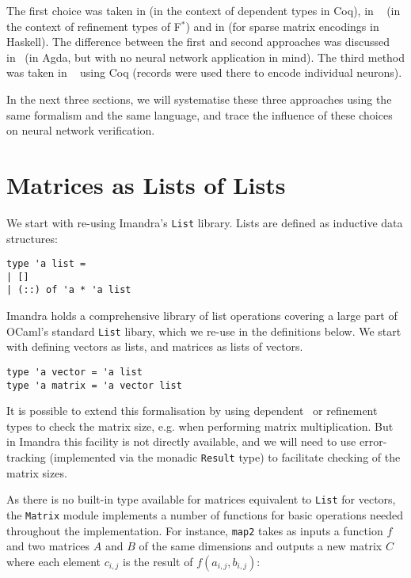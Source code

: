 \documentclass[runningheads]{llncs}
\begin{document}
The first choice was taken in \cite{heras_incidence_2011} (in the context of dependent types in Coq), in ~\cite{KokkeKKAA20} (in the context of refinement types of F$^*$) and in \cite{grant_sparse_1996} (for sparse matrix encodings in Haskell).  The difference between the first and second approaches was
discussed in~\cite{wood_vectors_2019} (in Agda, but with no neural network application in mind).
The third method was taken in ~\cite{MariaBLFGRG22} using Coq  (records were used there to encode individual neurons).

In the next three sections, we will systematise these three approaches using the same formalism and the same language,
and trace the influence of these choices on neural network verification.


\section{Matrices as Lists of Lists} \label{sec:lists}
We start with re-using  Imandra's  \lstinline{List} library. Lists are defined as inductive data structures:

\begin{lstlisting}[language=caml]
type 'a list =
| []
| (::) of 'a * 'a list
\end{lstlisting}


Imandra holds a comprehensive library of list operations covering a large part of OCaml's standard \lstinline{List} libary, which we re-use in the definitions below.
We start with defining vectors as lists, and matrices as lists of vectors. 

\begin{lstlisting}[frame=none, language=caml]
type 'a vector = 'a list
type 'a matrix = 'a vector list 
\end{lstlisting}

It is possible to extend this formalisation by using dependent~\cite{heras_incidence_2011} or refinement~\cite{KokkeKKAA20} types to check the matrix size, e.g. when performing matrix multiplication. But in Imandra this facility is not directly available, and we will need to use error-tracking (implemented via the monadic \lstinline{Result} type) to facilitate checking of the matrix sizes.

As there is no built-in type available for matrices equivalent to \lstinline{List} for vectors, the \lstinline{Matrix} module implements a number of functions for basic operations needed throughout the implementation. For instance, \lstinline{map2} takes as inputs a function $f$ and two matrices $A$ and $B$ of the same dimensions and outputs a new matrix $C$ where each element $c_{i,j}$ is the result of $f(a_{i, j}, b_{i, j})$:
\end{document}
